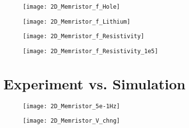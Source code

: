 \begin{figure}[!htp]
\centering
\texttt{[image: 2D\_Memristor\_f\_Hole]}
\caption{} 
\label{}
\end{figure}

\begin{figure}[!htp]
\centering
\texttt{[image: 2D\_Memristor\_f\_Lithium]}
\caption{} 
\label{}
\end{figure}

\begin{figure}[!htp]
\centering
\texttt{[image: 2D\_Memristor\_f\_Resistivity]}
\caption{} 
\label{}
\end{figure}


\begin{figure}[!htp]
\centering
\texttt{[image: 2D\_Memristor\_f\_Resistivity\_1e5]}
\caption{} 
\label{}
\end{figure}

\clearpage
\section{Experiment vs. Simulation}



\begin{figure}[!htp]
\centering
\texttt{[image: 2D\_Memristor\_5e-1Hz]}
\caption{} 
\label{}
\end{figure}


\begin{figure}[!htp]
\centering
\texttt{[image: 2D\_Memristor\_V\_chng]}
\caption{} 
\label{}
\end{figure}
